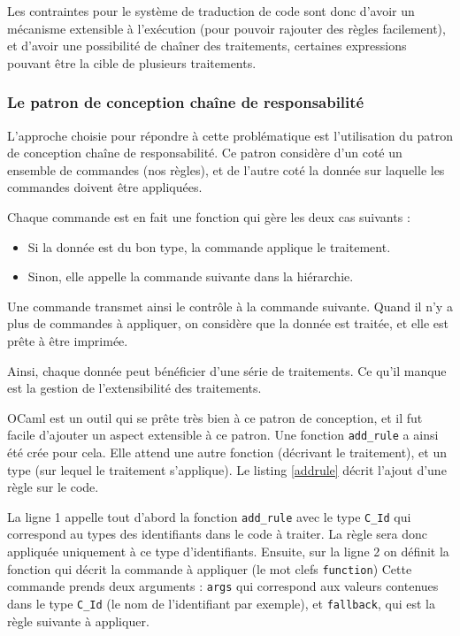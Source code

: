 \documentclass[a4paper, 11pt]{report}
\begin{document}
    Les contraintes pour le système de traduction de code sont donc d'avoir
    un mécanisme extensible à l'exécution (pour pouvoir rajouter des règles
    facilement), et d'avoir une possibilité de chaîner des traitements, certaines
    expressions pouvant être la cible de plusieurs traitements.

    \subsubsection{Le patron de conception chaîne de responsabilité}
    L'approche choisie pour répondre à cette problématique est l'utilisation
    du patron de conception chaîne de responsabilité. Ce patron considère d'un
    coté un ensemble de commandes (nos règles), et de l'autre coté la donnée sur
    laquelle les commandes doivent être appliquées.

    Chaque commande est en fait une fonction qui gère les deux cas suivants :
    \begin{itemize}
      \item Si la donnée est du bon type, la commande applique le traitement.
      \item Sinon, elle appelle la commande suivante dans la hiérarchie.
    \end{itemize}
    Une commande transmet ainsi le contrôle à la commande suivante.
    Quand il n'y a plus de commandes à appliquer, on considère que la donnée
    est traitée, et elle est prête à être imprimée.

    Ainsi, chaque donnée peut bénéficier d'une série de traitements. Ce qu'il
    manque est la gestion de l'extensibilité des traitements.

    OCaml est un outil qui se prête très bien à ce patron de conception, et il
    fut facile d'ajouter un aspect extensible à ce patron. Une fonction
    \texttt{add\_rule} a ainsi été crée pour cela. Elle attend une autre fonction
    (décrivant le traitement), et un type (sur lequel le traitement s'applique).
    Le listing \ref{addrule} décrit l'ajout d'une règle sur le code.

    

    La ligne 1 appelle tout d'abord la fonction \texttt{add\_rule} avec le type
    \texttt{C\_Id} qui correspond au types des identifiants dans le code à traiter.
    La règle sera donc appliquée uniquement à ce type d'identifiants. Ensuite,
    sur la ligne 2 on définit la fonction qui décrit la commande à appliquer
    (le mot clefs \texttt{function}) Cette commande prends deux arguments :
    \texttt{args} qui correspond aux valeurs contenues dans le type
    \texttt{C\_Id} (le nom de l'identifiant par exemple), et
    \texttt{fallback}, qui est la règle suivante à appliquer.
\end{document}
